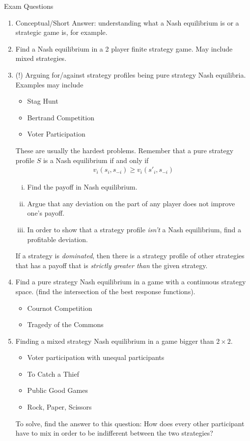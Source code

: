 \documentclass[8pt]{extarticle}
\title{}
\author{Avinash Iyer}
\date{}
\begin{document}
  \begin{problem}{Exam Questions}
    \begin{enumerate}[(1)]
      \item Conceptual/Short Answer: understanding what a Nash equilibrium is or a strategic game is, for example.
      \item Find a Nash equilibrium in a 2 player finite strategy game. May include mixed strategies.
      \item (!) Arguing for/against strategy profiles being pure strategy Nash equilibria. Examples may include
        \begin{itemize}
          \item Stag Hunt
          \item Bertrand Competition
          \item Voter Participation
        \end{itemize}
        These are usually the hardest problems. Remember that a pure strategy profile $S$ is a Nash equilibrium if and only if
        \begin{align*}
          v_i(s_i,s_{-i}) \geq v_i(s'_i,s_{-i})
        \end{align*}
        \begin{enumerate}[(i)]
          \item Find the payoff in Nash equilibrium.
          \item Argue that any deviation on the part of any player does not improve one's payoff.
          \item In order to show that a strategy profile \textit{isn't} a Nash equilibrium, find a profitable deviation.
        \end{enumerate}
        If a strategy is \textit{dominated}, then there is a strategy profile of other strategies that has a payoff that is \textit{strictly greater than} the given strategy.
      \item Find a pure strategy Nash equilibrium in a game with a continuous strategy space. (find the intersection of the best response functions).
        \begin{itemize}
          \item Cournot Competition
          \item Tragedy of the Commons
        \end{itemize}
      \item Finding a mixed strategy Nash equilibrium in a game bigger than $2\times 2$.
        \begin{itemize}
          \item Voter participation with unequal participants
          \item To Catch a Thief
          \item Public Good Games
          \item Rock, Paper, Scissors
        \end{itemize}
        To solve, find the answer to this question: How does every other participant have to mix in order to be indifferent between the two strategies?
    \end{enumerate}
  \end{problem}
\end{document}
